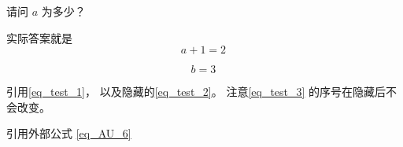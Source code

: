 \begin{example}{}
请问 $a$ 为多少？
\pay

实际答案就是
\begin{equation}\label{eq_test_2}
a + 1 = 2~
\end{equation}
\paid
\end{example}

\begin{equation}\label{eq_test_3}
b = 3~
\end{equation}


引用\autoref{eq_test_1}， 以及隐藏的\autoref{eq_test_2}。 注意\autoref{eq_test_3} 的序号在隐藏后不会改变。

引用外部公式 \autoref{eq_AU_6}~
